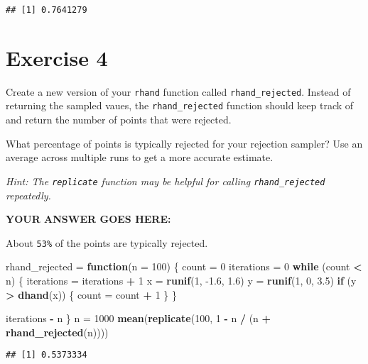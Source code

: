 \documentclass[
]{article}
\newenvironment{Shaded}{\begin{snugshade}}{\end{snugshade}}
\newcommand{\ControlFlowTok}[1]{\textcolor[rgb]{0.13,0.29,0.53}{\textbf{#1}}}
\newcommand{\DataTypeTok}[1]{\textcolor[rgb]{0.13,0.29,0.53}{#1}}
\newcommand{\DecValTok}[1]{\textcolor[rgb]{0.00,0.00,0.81}{#1}}
\newcommand{\FloatTok}[1]{\textcolor[rgb]{0.00,0.00,0.81}{#1}}
\newcommand{\KeywordTok}[1]{\textcolor[rgb]{0.13,0.29,0.53}{\textbf{#1}}}
\newcommand{\NormalTok}[1]{#1}
\newcommand{\OperatorTok}[1]{\textcolor[rgb]{0.81,0.36,0.00}{\textbf{#1}}}
\newcommand{\StringTok}[1]{\textcolor[rgb]{0.31,0.60,0.02}{#1}}
\begin{document}
\begin{verbatim}
## [1] 0.7641279
\end{verbatim}

\hypertarget{exercise-4}{%
\section{Exercise 4}\label{exercise-4}}

Create a new version of your \texttt{rhand} function called
\texttt{rhand\_rejected}. Instead of returning the sampled vaues, the
\texttt{rhand\_rejected} function should keep track of and return the
number of points that were rejected.

What percentage of points is typically rejected for your rejection
sampler? Use an average across multiple runs to get a more accurate
estimate.

\emph{Hint: The \texttt{replicate} function may be helpful for calling
\texttt{rhand\_rejected} repeatedly.}

\textbf{YOUR ANSWER GOES HERE:}

About \texttt{53\%} of the points are typically rejected.

\begin{Shaded}
\begin{Highlighting}[]
\NormalTok{rhand\_rejected =}\StringTok{ }\ControlFlowTok{function}\NormalTok{(}\DataTypeTok{n =} \DecValTok{100}\NormalTok{) \{}
\NormalTok{   count =}\StringTok{ }\DecValTok{0}
\NormalTok{   iterations =}\StringTok{ }\DecValTok{0}
   \ControlFlowTok{while}\NormalTok{ (count }\OperatorTok{\textless{}}\StringTok{ }\NormalTok{n) \{}
\NormalTok{      iterations =}\StringTok{ }\NormalTok{iterations }\OperatorTok{+}\StringTok{ }\DecValTok{1}
\NormalTok{      x =}\StringTok{ }\KeywordTok{runif}\NormalTok{(}\DecValTok{1}\NormalTok{, }\FloatTok{{-}1.6}\NormalTok{, }\FloatTok{1.6}\NormalTok{)}
\NormalTok{      y =}\StringTok{ }\KeywordTok{runif}\NormalTok{(}\DecValTok{1}\NormalTok{, }\DecValTok{0}\NormalTok{, }\FloatTok{3.5}\NormalTok{)}
      \ControlFlowTok{if}\NormalTok{ (y }\OperatorTok{\textgreater{}}\StringTok{ }\KeywordTok{dhand}\NormalTok{(x)) \{}
\NormalTok{         count =}\StringTok{ }\NormalTok{count }\OperatorTok{+}\StringTok{ }\DecValTok{1}
\NormalTok{      \}}
\NormalTok{   \}}

\NormalTok{   iterations }\OperatorTok{{-}}\StringTok{ }\NormalTok{n}
\NormalTok{\}}
\NormalTok{n =}\StringTok{ }\DecValTok{1000}
\KeywordTok{mean}\NormalTok{(}\KeywordTok{replicate}\NormalTok{(}\DecValTok{100}\NormalTok{, }\DecValTok{1} \OperatorTok{{-}}\StringTok{ }\NormalTok{n }\OperatorTok{/}\StringTok{ }\NormalTok{(n }\OperatorTok{+}\StringTok{ }\KeywordTok{rhand\_rejected}\NormalTok{(n))))}
\end{Highlighting}
\end{Shaded}

\begin{verbatim}
## [1] 0.5373334
\end{verbatim}
\end{document}
